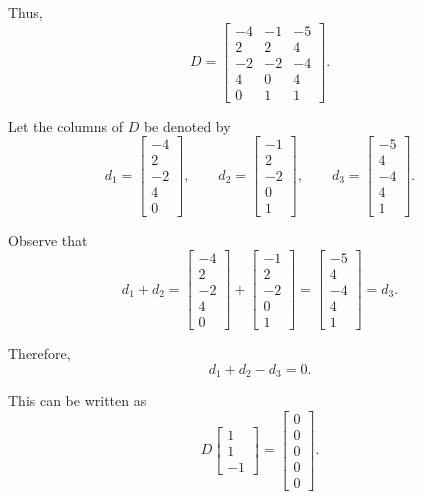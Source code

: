 \documentclass[12pt]{article}
\begin{document}
	Thus,
	\[
	\boxed{
		D=
		\begin{bmatrix}
			-4&-1&-5\\
			2&2&4\\
			-2&-2&-4\\
			4&0&4\\
			0&1&1
	\end{bmatrix}}.
	\]
	
	Let the columns of \(D\) be denoted by
	\[
	d_1=
	\begin{bmatrix}
		-4\\2\\-2\\4\\0
	\end{bmatrix},
	\qquad
	d_2=
	\begin{bmatrix}
		-1\\2\\-2\\0\\1
	\end{bmatrix},
	\qquad
	d_3=
	\begin{bmatrix}
		-5\\4\\-4\\4\\1
	\end{bmatrix}.
	\]
	
	Observe that
	\[
	d_1+d_2
	=
	\begin{bmatrix}
		-4\\2\\-2\\4\\0
	\end{bmatrix}
	+
	\begin{bmatrix}
		-1\\2\\-2\\0\\1
	\end{bmatrix}
	=
	\begin{bmatrix}
		-5\\4\\-4\\4\\1
	\end{bmatrix}
	=d_3.
	\]
	
	Therefore,
	\[
	d_1+d_2-d_3=0.
	\]
	
	This can be written as
	\[
	D
	\begin{bmatrix}
		1\\1\\-1
	\end{bmatrix}
	=
	\begin{bmatrix}
		0\\0\\0\\0\\0
	\end{bmatrix}.
	\]
	
\end{document}
